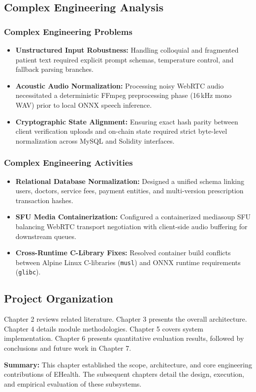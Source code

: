\subsection{Complex Engineering Analysis}

\subsubsection{Complex Engineering Problems}
\begin{itemize}
    \setlength{\itemsep}{1pt}
    \setlength{\parskip}{0pt}
    \item \textbf{Unstructured Input Robustness:} Handling colloquial and fragmented patient text required explicit prompt schemas, temperature control, and fallback parsing branches.
    \item \textbf{Acoustic Audio Normalization:} Processing noisy WebRTC audio necessitated a deterministic FFmpeg preprocessing phase (16\,kHz mono WAV) prior to local ONNX speech inference.
    \item \textbf{Cryptographic State Alignment:} Ensuring exact hash parity between client verification uploads and on-chain state required strict byte-level normalization across MySQL and Solidity interfaces.
\end{itemize}

\subsubsection{Complex Engineering Activities}
\begin{itemize}
    \setlength{\itemsep}{1pt}
    \setlength{\parskip}{0pt}
    \item \textbf{Relational Database Normalization:} Designed a unified schema linking users, doctors, service fees, payment entities, and multi-version prescription transaction hashes.
    \item \textbf{SFU Media Containerization:} Configured a containerized mediasoup SFU balancing WebRTC transport negotiation with client-side audio buffering for downstream queues.
    \item \textbf{Cross-Runtime C-Library Fixes:} Resolved container build conflicts between Alpine Linux C-libraries (\texttt{musl}) and ONNX runtime requirements (\texttt{glibc}).
\end{itemize}

\subsection{Project Organization}
Chapter 2 reviews related literature. Chapter 3 presents the overall architecture. Chapter 4 details module methodologies. Chapter 5 covers system implementation. Chapter 6 presents quantitative evaluation results, followed by conclusions and future work in Chapter 7.

\vspace{2mm}
\noindent\textbf{Summary:} This chapter established the scope, architecture, and core engineering contributions of EHealth. The subsequent chapters detail the design, execution, and empirical evaluation of these subsystems.